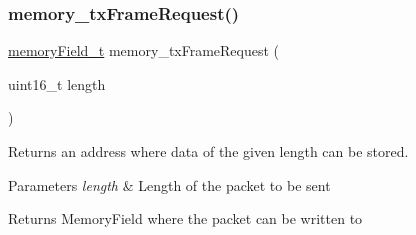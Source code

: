 \subsubsection{\texorpdfstring{memory\_txFrameRequest()}{memory\_txFrameRequest()}}
{\footnotesize\ttfamily \mbox{\hyperlink{group__memory_ga1d04d80fae40964f55d2df46b5d64785}{memory\+Field\+\_\+t}} memory\+\_\+tx\+Frame\+Request (\begin{DoxyParamCaption}\item[{uint16\+\_\+t}]{length }\end{DoxyParamCaption})}



Returns an address where data of the given length can be stored. 


\begin{DoxyParams}{Parameters}
{\em length} & Length of the packet to be sent \\
\hline
\end{DoxyParams}
\begin{DoxyReturn}{Returns}
Memory\+Field where the packet can be written to 
\end{DoxyReturn}
